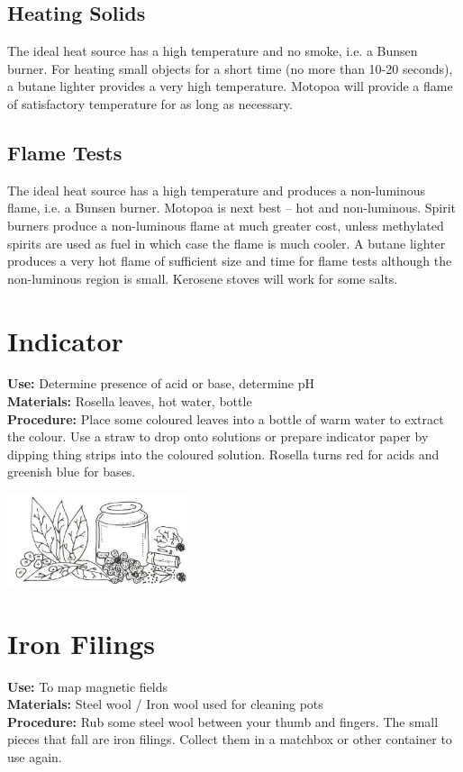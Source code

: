 \begin{multicols}{2}
\subsection{Heating Solids}
The ideal heat source has a high temperature and no smoke, i.e. a Bunsen burner. 
For heating small objects for a short time (no more than 10-20 seconds), 
a butane lighter provides a very high temperature. 
Motopoa will provide a flame of satisfactory temperature 
for as long as necessary.

\subsection{Flame Tests}
The ideal heat source has a high temperature 
and produces a non-luminous flame, i.e. a Bunsen burner. 
Motopoa is next best – hot and non-luminous. 
Spirit burners produce a non-luminous flame at much greater cost, 
unless methylated spirits are used as fuel 
in which case the flame is much cooler. 
A butane lighter produces a very hot flame of sufficient size 
and time for flame tests although the non-luminous region is small. 
Kerosene stoves will work for some salts.

\section{Indicator}
\label{sec:indicator}
\vspace{-10pt}
\textbf{Use:} Determine presence of acid or base, determine pH\\
\textbf{Materials:} Rosella leaves, hot water, bottle\\
\textbf{Procedure:} Place some coloured leaves into a bottle of warm water to extract the colour. Use a straw to drop onto solutions or prepare indicator paper by dipping thing strips into the coloured solution. Rosella turns red for acids and greenish blue for bases.
\begin{center}
\includegraphics[width=0.4\textwidth]{./img/vso/making-indicators.jpg}
\end{center}

\section{Iron Filings}
\label{sec:iron-filings}
\vspace{-10pt}
\textbf{Use:} To map magnetic fields\\
\textbf{Materials:} Steel wool / Iron wool used for cleaning pots\\
\textbf{Procedure:} Rub some steel wool between your thumb and fingers.  The small pieces that fall are iron filings.  Collect them in a matchbox or other container to use again.


\end{multicols}
